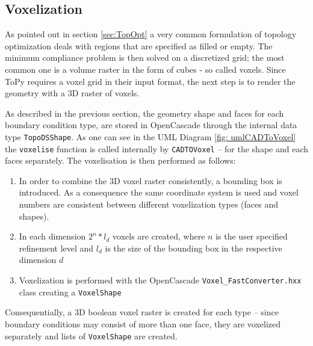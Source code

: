 \subsection{Voxelization}
\label{sec: Voxelization}

As pointed out in section \ref{sec:TopOpt} a very common formulation of topology optimization deals with regions that are specified as filled or empty. The minimum compliance problem is then solved on a discretized grid; the most common one is a volume raster in the form of cubes - so called voxels. Since ToPy requires a voxel grid in their input format, the next step is to render the geometry with a 3D raster of voxels.  

As described in the previous section, the geometry shape and faces for each boundary condition type, are stored in OpenCascade through the internal data type \lstinline|TopoDSShape|. As one can see in the UML Diagram \ref{fig: umlCADToVoxel} the \lstinline|voxelise| function is called internally by \lstinline|CADTOVoxel| -- for the shape and each faces separately. The voxelisation is then performed as follows: 
\begin{enumerate}
\item In order to combine the 3D voxel raster consistently, a bounding box is introduced. As a consequence the same coordinate system is used and voxel numbers are consistent between different voxelization types (faces and shapes). 
\item In each dimension $2^n*l_d$ voxels are created, where $n$ is the user specified refinement level and $l_d$ is the size of the bounding box in the respective dimension $d$
\item Voxelization is performed with the OpenCascade  \lstinline|Voxel_FastConverter.hxx| class creating a \lstinline|VoxelShape|
\end{enumerate}

Consequentially, a 3D boolean voxel raster is created for each type -- since boundary conditions may consist of more than one face, they are voxelized separately and lists of \lstinline|VoxelShape| are created. 